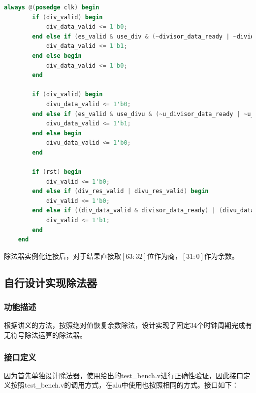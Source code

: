 \documentclass[UTF-8,twoside,c5size]{ctexart}
\begin{document}
	\begin{lstlisting}[language=verilog]
	always @(posedge clk) begin
		if (div_valid) begin
			div_data_valid <= 1'b0;
		end else if (es_valid & use_div & (~divisor_data_ready | ~dividend_data_ready)) begin
			div_data_valid <= 1'b1;
		end else begin
			div_data_valid <= 1'b0;
		end
		
		if (div_valid) begin
			divu_data_valid <= 1'b0;
		end else if (es_valid & use_divu & (~u_divisor_data_ready | ~u_dividend_data_ready)) begin
			divu_data_valid <= 1'b1;
		end else begin
			divu_data_valid <= 1'b0;
		end
		
		if (rst) begin
			div_valid <= 1'b0;
		end else if (div_res_valid | divu_res_valid) begin
			div_valid <= 1'b0;
		end else if ((div_data_valid & divisor_data_ready) | (divu_data_valid & u_divisor_data_ready)) begin
			div_valid <= 1'b1;
		end
	end
	\end{lstlisting}

	除法器实例化连接后，对于结果直接取$[63:32]$位作为商，$[31:0]$作为余数。
	
	\subsection{自行设计实现除法器}
	
	\subsubsection{功能描述}
	
	根据讲义的方法，按照绝对值恢复余数除法，设计实现了固定34个时钟周期完成有无符号除法运算的除法器。
	
	\subsubsection{接口定义}
	
	因为首先单独设计除法器，使用给出的test\_bench.v进行正确性验证，因此接口定义按照test\_bench.v的调用方式，在alu中使用也按照相同的方式。接口如下：
	
\end{document}
